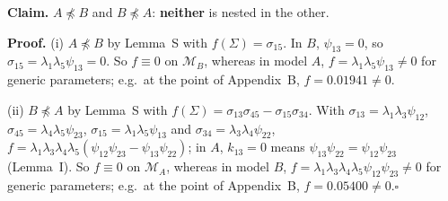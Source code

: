 \documentclass[10pt,a4paper]{article}
\newcommand{\nnest}{\not\preceq}
\begin{document}
\par\bigskip
\noindent\textbf{Claim.} $A \nnest B$ and $B \nnest A$: \textbf{neither} is nested in the other.\par\smallskip
\noindent\textbf{Proof.} (i) $A\nnest B$ by Lemma~S with $f(\Sigma)=\sigma_{15}$. In $B$, $\psi_{13}=0$, so $\sigma_{15}=\lambda_1\lambda_5\psi_{13}=0$. So $f\equiv0$ on $\mathcal M_B$, whereas in model $A$, $f=\lambda_1\lambda_5\psi_{13}\neq0$ for generic parameters; e.g.\ at the point of Appendix~B, $f=0.01941\neq0$.\par\smallskip
\noindent(ii) $B\nnest A$ by Lemma~S with $f(\Sigma)=\sigma_{13}\sigma_{45} - \sigma_{15}\sigma_{34}$. With $\sigma_{13}=\lambda_1\lambda_3\psi_{12}$, $\sigma_{45}=\lambda_4\lambda_5\psi_{23}$, $\sigma_{15}=\lambda_1\lambda_5\psi_{13}$ and $\sigma_{34}=\lambda_3\lambda_4\psi_{22}$, $f=\lambda_1\lambda_3\lambda_4\lambda_5(\psi_{12}\psi_{23}-\psi_{13}\psi_{22})$; in $A$, $k_{13}=0$ means $\psi_{13}\psi_{22}=\psi_{12}\psi_{23}$ (Lemma~I). So $f\equiv0$ on $\mathcal M_A$, whereas in model $B$, $f=\lambda_1\lambda_3\lambda_4\lambda_5\psi_{12}\psi_{23}\neq0$ for generic parameters; e.g.\ at the point of Appendix~B, $f=0.05400\neq0$.\hfill$\square$\par\medskip
{}

\clearpage
\end{document}
